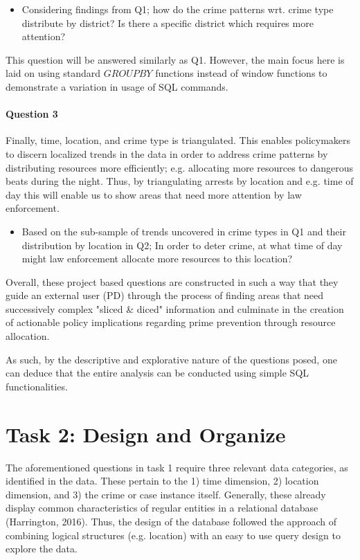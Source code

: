 \documentclass[a4paper]{article}
\begin{document}
\begin{itemize}
    \item Considering findings from Q1; how do the crime patterns wrt. crime type distribute by district? Is there a specific district which requires more attention?
\end{itemize}

This question will be answered similarly as Q1. However, the main focus here is laid on using standard $GROUP BY$ functions instead of window functions to demonstrate a variation in usage of SQL commands. 

\paragraph{Question 3} Finally, time, location, and crime type is triangulated. This enables policymakers to discern localized trends in the data in order to address crime patterns by distributing resources more efficiently; e.g. allocating more resources to dangerous beats during the night. Thus, by triangulating arrests by location and e.g. time of day this will enable us to show areas that need more attention by law enforcement.

\begin{itemize}
  \item Based on the sub-sample of trends uncovered in crime types in Q1 and their distribution by location in Q2; In order to deter crime, at what time of day might law enforcement allocate more resources to this location?
\end{itemize}

Overall, these project based questions are constructed in such a way that they guide an external user (PD) through the process of finding areas that need successively complex "sliced \& diced" information and culminate in the creation of actionable policy implications regarding prime prevention through resource allocation.

As such, by the descriptive and explorative nature of the questions posed, one can deduce that the entire analysis can be conducted using simple SQL functionalities.



\section{Task 2: Design and Organize}
The aforementioned questions in task 1 require three relevant data categories, as identified in the data. These pertain to the 1) time dimension, 2) location dimension, and 3) the crime or case instance itself. Generally, these already display common characteristics of regular entities in a relational database (Harrington, 2016). Thus, the design of the database followed the approach of combining logical structures (e.g. location) with an easy to use query design to explore the data.
\end{document}
